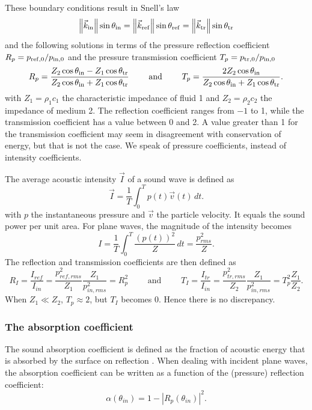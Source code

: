 These boundary conditions result in Snell's law
\[
\left\|\vec{k}_\mathrm{in}\right\| \sin\theta_\mathrm{in} = \left\|\vec{k}_\mathrm{ref}\right\| \sin\theta_\mathrm{ref} = \left\|\vec{k}_\mathrm{tr}\right\| \sin\theta_\mathrm{tr}
\]
and the following solutions in terms of the pressure reflection coefficient $R_p = p_\mathrm{ref, 0}/p_\mathrm{in, 0}$ and the pressure transmission coefficient $T_p = p_\mathrm{tr, 0}/p_\mathrm{in, 0}$ 
\[
R_p = \frac{Z_2 \cos \theta_\mathrm{in} - Z_1 \cos \theta_\mathrm{tr}}{Z_2 \cos \theta_\mathrm{in} + Z_1 \cos \theta_\mathrm{tr}} \qquad \textrm{ and } \qquad
T_p = \frac{2 Z_2 \cos \theta_\mathrm{in} }{Z_2 \cos \theta_\mathrm{in} + Z_1 \cos \theta_\mathrm{tr}}.
\]
with $Z_1 = \rho_1 c_1$ the characteristic impedance of fluid 1 and $Z_2 = \rho_2 c_2$ the impedance of medium 2.  
The reflection coefficient ranges from $-1$ to 1, while the transmission coefficient has a value between 0 and 2. A value greater than 1 for the transmission coefficient may seem in disagreement with conservation of energy, but that is not the case. We speak of pressure coefficients, instead of intensity coefficients. 

The average acoustic intensity $\vec{I}$ of a sound wave is defined as 
\[
\vec{I} = \frac{1}{T} \int^{T}_{0}{p(t) \vec{v}(t) \,dt}.
\]
with $p$ the instantaneous pressure and $\vec{v}$ the particle velocity. It equals the sound power per unit area. For plane waves, the magnitude of the intensity becomes 
\[
I = \frac{1}{T} \int^{T}_{0}{\frac{\left(p(t)\right)^2}{Z} \,dt} = \frac{p^2_{rms}}{Z}.
\]
The reflection and transmission coefficients are then defined as
\[
R_I = \frac{I_{ref}}{I_{in}} = \frac{p^2_{ref,rms}}{Z_1} \frac{Z_1}{p^2_{in,rms}} = R_p^2 \qquad\textrm{ and } \qquad T_I = \frac{I_{tr}}{I_{in}} = \frac{p^2_{tr,rms}}{Z_2} \frac{Z_1}{p^2_{in,rms}} = T_p^2 \frac{Z_1}{Z_2}. 
\]
When $Z_1 \ll Z_2$, $T_p \approx 2$, but $T_I$ becomes 0. Hence there is no discrepancy.




\subsubsection{The absorption coefficient}
The sound absorption coefficient is defined as the fraction of acoustic energy that is absorbed by the surface on reflection \cite[p.12]{Geetere}.  When dealing with incident plane waves, the absorption coefficient can be written as a function of the (pressure) reflection coefficient:
\begin{equation}
\alpha(\theta_{in}) = 1 - \left|R_p(\theta_{in})\right|^2.
\label{absorption}
\end{equation}




